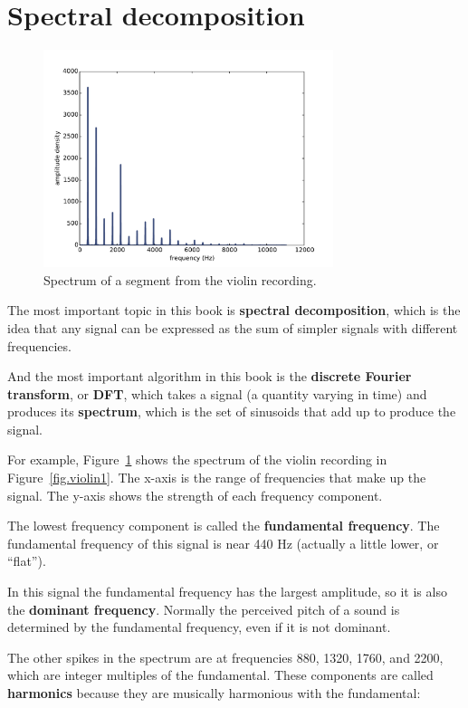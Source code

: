 \documentclass[12pt]{book}
\begin{document}
\section{Spectral decomposition}

\begin{figure}
\centerline{\includegraphics[height=2.5in]{figs/violin2.pdf}}
\caption{Spectrum of a segment from the violin recording.}
\label{fig.violin2}
\end{figure}

The most important topic in this book is {\bf spectral decomposition},
which is the idea that any signal can be expressed as the sum of
simpler signals with different frequencies.

And the most important algorithm in this book is the {\bf discrete
  Fourier transform}, or {\bf DFT}, which takes a signal (a quantity
varying in time) and produces its {\bf spectrum}, which is the set of
sinusoids that add up to produce the signal.

For example, Figure~\ref{fig.violin2} shows the spectrum of the violin
recording in Figure~\ref{fig.violin1}.  The x-axis is the range of
frequencies that make up the signal.  The y-axis shows the strength of
each frequency component.

The lowest frequency component is called the {\bf fundamental
  frequency}.  The fundamental frequency of this signal is near 440 Hz
(actually a little lower, or ``flat'').

In this signal the fundamental frequency has the largest amplitude,
so it is also the {\bf dominant frequency}.
Normally the perceived pitch of a sound is determined by the
fundamental frequency, even if it is not dominant. 

The other spikes in the spectrum are at frequencies 880, 1320, 1760, and
2200, which are integer multiples of the fundamental.
These components are called {\bf harmonics} because they are
musically harmonious with the fundamental:
\end{document}
